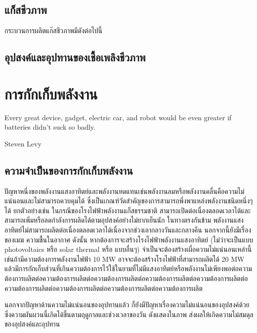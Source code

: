 \documentclass[a4paper,nobib,openany]{tufte-book}
\begin{document}
\section{แก็สชีวภาพ}
\label{sec:orgf301910}
กระบวนการผลิตแก๊สชีวภาพมีดังต่อไปนี้

\section{อุปสงค์และอุปทานของเชื้อเพลิงชีวภาพ}
\label{sec:org8a37a29}
\chapter{การกักเก็บพลังงาน}
\label{sec:org8c79697}

\epigraph{Every great device, gadget, electric car, and robot would be even greater if batteries didn't suck so badly.}{Steven Levy}

\section{ความจำเป็นของการกักเก็บพลังงาน}
\label{sec:orgf0abca0}
ปัญหาหนึ่งของพลังงานแสงอาทิตย์และพลังงานทดแทนเช่นพลังงานลมหรือพลังงานคลื่นคือความไม่แน่นอนและไม่สามารถควบคุมได้
ซึ่งเป็นเกณฑ์วัดสำคัญของการสามารถพึ่งพาแหล่งพลังงานชนิดหนึ่งๆได้
ยกตัวอย่างเช่น ในกรณีของโรงไฟฟ้าพลังงานแก็สธรรมชาติ
สามารถเปิดต่อเนื่องตลอดเวลาได้และสามารถเพิ่มหรือลดกำลังการผลิดได้ตามอุปสงค์อย่างไม่ยากเย็นนัก
ในทางตรงกันข้าม
พลังงานแสงอาทิตย์ไม่สามารถผลิตต่อเนื่องตลอดเวลาได้เนื่องจากช่วงเลากลางวันและกลางคืน
นอกจากนี้ยังมีเรื่องของเมฆ ความชื้นในอากาศ ดังนั้น
หากต้องการจะสร้างโรงไฟฟ้าพลังงานแสงอาทิตย์ (ไม่ว่าจะเป็นแบบ
photovoltaics หรือ solar thermal หรือ แบบอื่นๆ)
จำเป็นจะต้องสร้างเผื่อความไม่แน่นอนเหล่านี้
เช่นถ้ามีความต้องการพลังงานไฟฟ้า 10 MW
อาจจะต้องสร้างโรงไฟฟ้าที่สามารถผลิตได้ 20 MW
แล้วมีการกักเก็บส่วนที่เกินความต้องการไว้ใช้ในยามที่ไม่มีแสงอาทิตย์หรือพลังงานไม่เพียงพอต่อความต้องการผลิตต่อความต้องการผลิตต่อความต้องการผลิตต่อความต้องการผลิตต่อความต้องการผลิตต่อความต้องการผลิตต่อความต้องการผลิตต่อความต้องการผลิตต่อความต้องการผลิต

นอกจากปัญหาด้านความไม่แน่นอนของอุปทานแล้ว
ก็ยังมีปัญหาเรื่องความไม่แน่นอนของอุปสงค์ด้วย
ซึ่งความผันผวนนี้เกิดได้ขึ้นตามฤดูกาลและช่วงเวลาของวัน ดังแสดงในภาพ
ส่งผลให้เกิดความไม่สมดุลของอุปสงค์และอุปทาน
\end{document}
